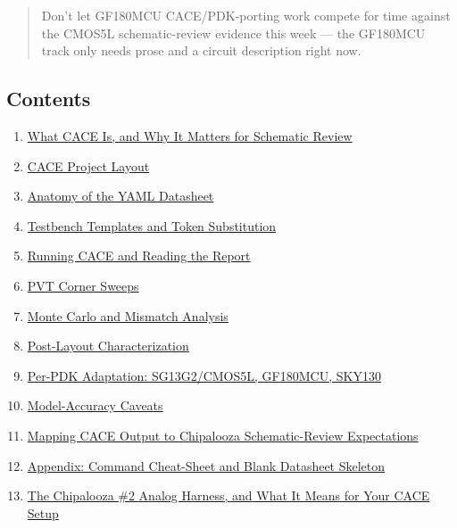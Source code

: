 \documentclass[
]{article}
\providecommand{\tightlist}{%
  \setlength{\itemsep}{0pt}\setlength{\parskip}{0pt}}
\begin{document}
\begin{quote}
Don't let GF180MCU CACE/PDK-porting work compete for time against the
CMOS5L schematic-review evidence this week --- the GF180MCU track only
needs prose and a circuit description right now.
\end{quote}

\hypertarget{contents}{%
\subsection{Contents}\label{contents}}

\begin{enumerate}
\def\labelenumi{\arabic{enumi}.}
\tightlist
\item
  \protect\hyperlink{1-what-cace-is-and-why-it-matters-for-schematic-review}{What
  CACE Is, and Why It Matters for Schematic Review}
\item
  \protect\hyperlink{2-cace-project-layout}{CACE Project Layout}
\item
  \protect\hyperlink{3-anatomy-of-the-yaml-datasheet}{Anatomy of the
  YAML Datasheet}
\item
  \protect\hyperlink{4-testbench-templates-and-token-substitution}{Testbench
  Templates and Token Substitution}
\item
  \protect\hyperlink{5-running-cace-and-reading-the-report}{Running CACE
  and Reading the Report}
\item
  \protect\hyperlink{6-pvt-corner-sweeps}{PVT Corner Sweeps}
\item
  \protect\hyperlink{7-monte-carlo-and-mismatch-analysis}{Monte Carlo
  and Mismatch Analysis}
\item
  \protect\hyperlink{8-post-layout-characterization}{Post-Layout
  Characterization}
\item
  \protect\hyperlink{9-per-pdk-adaptation-sg13g2cmos5l-gf180mcu-sky130}{Per-PDK
  Adaptation: SG13G2/CMOS5L, GF180MCU, SKY130}
\item
  \protect\hyperlink{10-model-accuracy-caveats}{Model-Accuracy Caveats}
\item
  \protect\hyperlink{11-mapping-cace-output-to-chipalooza-schematic-review-expectations}{Mapping
  CACE Output to Chipalooza Schematic-Review Expectations}
\item
  \protect\hyperlink{12-appendix-command-cheat-sheet-and-blank-datasheet-skeleton}{Appendix:
  Command Cheat-Sheet and Blank Datasheet Skeleton}
\item
  \protect\hyperlink{13-the-chipalooza-2-analog-harness-and-what-it-means-for-your-cace-setup}{The
  Chipalooza \#2 Analog Harness, and What It Means for Your CACE Setup}
\end{enumerate}
\end{document}
